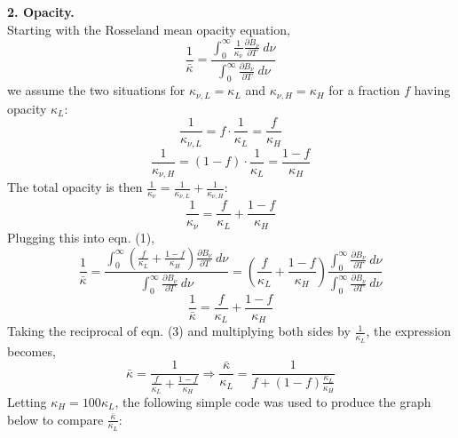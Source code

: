 \documentclass[14pt]{extarticle}
\begin{document}
\noindent \textbf{2. Opacity.} \\

Starting with the Rosseland mean opacity equation,
\begin{equation}
	\frac{1}{\bar{\kappa}} = \frac{ \int_{0}^{\infty} \frac{1}{\kappa_{\nu}} \frac{\partial B_{\nu}}{\partial T} \ d\nu}{\int_{0}^{\infty} \frac{\partial B_{\nu}}{\partial T} \ d\nu}
\end{equation}
we assume the two situations for $\kappa_{\nu,L} = \kappa_L$ and $\kappa_{\nu,H} = \kappa_H$ for a fraction $f$ having opacity $\kappa_L$: 
$$ \frac{1}{\kappa_{\nu,L}} = f \cdot \frac{1}{\kappa_L} = \frac{f}{\kappa_H} $$
$$ \frac{1}{\kappa_{\nu,H}} = (1-f) \cdot \frac{1}{\kappa_L} = \frac{1-f}{\kappa_H} $$
The total opacity is then $\frac{1}{\kappa_{\nu}} = \frac{1}{\kappa_{\nu,L}} + \frac{1}{\kappa_{\nu,H}}$:
\begin{equation}
\frac{1}{\kappa_{\nu}} = \frac{f}{\kappa_L} + \frac{1-f}{\kappa_H}
\end{equation}
Plugging this into eqn. (1),
$$
\frac{1}{\bar{\kappa}} = \frac{ \int_{0}^{\infty} \left(\frac{f}{\kappa_L} + \frac{1-f}{\kappa_H} \right)  \frac{\partial B_{\nu}}{\partial T} \ d\nu}{\int_{0}^{\infty} \frac{\partial B_{\nu}}{\partial T} \ d\nu} = \left(\frac{f}{\kappa_L} + \frac{1-f}{\kappa_H} \right) \frac{ \int_{0}^{\infty} \frac{\partial B_{\nu}}{\partial T} \ d\nu}{\int_{0}^{\infty} \frac{\partial B_{\nu}}{\partial T} \ d\nu}
$$
\begin{equation}
\frac{1}{\bar{\kappa}} = \frac{f}{\kappa_L} + \frac{1-f}{\kappa_H}
\end{equation}
Taking the reciprocal of eqn. (3) and multiplying both sides by $\frac{1}{\kappa_L}$, the expression becomes,
$$ \bar{ \kappa} = \frac{1}{\frac{f}{\kappa_L} + \frac{1-f}{\kappa_H}} \Rightarrow \frac{\bar{\kappa}}{\kappa_L} = \frac{1}{f + (1-f)\frac{\kappa_L}{\kappa_H}} $$
Letting $\kappa_H=100\kappa_L$, the following simple code was used to produce the graph below to compare $\frac{\bar{\kappa}}{\kappa_L}$:
\end{document}
